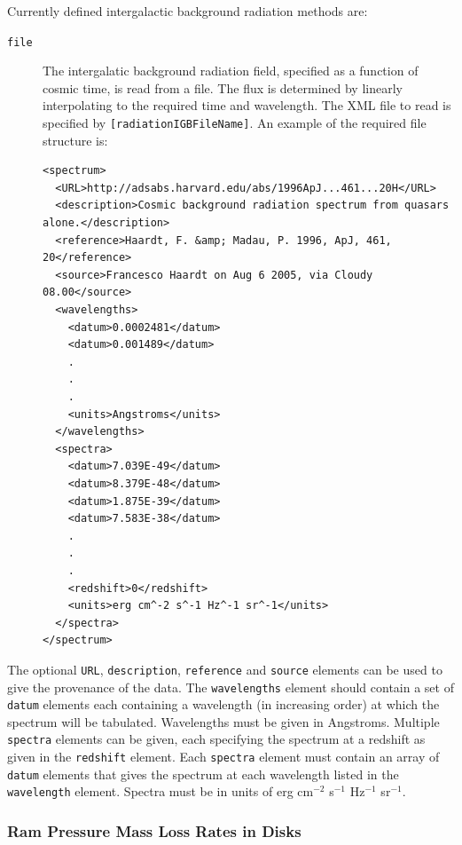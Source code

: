 Currently defined intergalactic background radiation methods are:
\begin{description}
 \item [{\tt file}] The intergalatic background radiation field, specified as a function of cosmic time, is read from a file. The flux is determined by linearly interpolating to the required time and wavelength. The XML file to read is specified by {\tt [radiationIGBFileName]}. An example of the required file structure is:
 \begin{verbatim}
<spectrum>
  <URL>http://adsabs.harvard.edu/abs/1996ApJ...461...20H</URL>
  <description>Cosmic background radiation spectrum from quasars alone.</description>
  <reference>Haardt, F. &amp; Madau, P. 1996, ApJ, 461, 20</reference>
  <source>Francesco Haardt on Aug 6 2005, via Cloudy 08.00</source>
  <wavelengths>
    <datum>0.0002481</datum>
    <datum>0.001489</datum>
    .
    .
    .
    <units>Angstroms</units>
  </wavelengths>
  <spectra>
    <datum>7.039E-49</datum>
    <datum>8.379E-48</datum>
    <datum>1.875E-39</datum>
    <datum>7.583E-38</datum>
    .
    .
    .
    <redshift>0</redshift>
    <units>erg cm^-2 s^-1 Hz^-1 sr^-1</units>
  </spectra>
</spectrum>
 \end{verbatim}
\end{description}
The optional {\tt URL}, {\tt description}, {\tt reference} and {\tt source} elements can be used to give the provenance of the data. The {\tt wavelengths} element should contain a set of {\tt datum} elements each containing a wavelength (in increasing order) at which the spectrum will be tabulated. Wavelengths must be given in Angstroms. Multiple {\tt spectra} elements can be given, each specifying the spectrum at a redshift as given in the {\tt redshift} element. Each {\tt spectra} element must contain an array of {\tt datum} elements that gives the spectrum at each wavelength listed in the {\tt wavelength} element. Spectra must be in units of erg cm$^{-2}$ s$^{-1}$ Hz$^{-1}$ sr$^{-1}$.

\subsubsection{Ram Pressure Mass Loss Rates in Disks}

